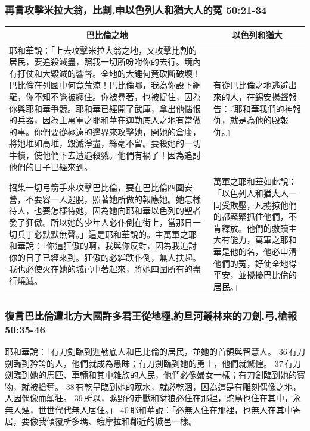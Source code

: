 \subsubsection{再言攻擊米拉大翁，比割,申以色列人和猶大人的冤 50:21-34}
\begin{table}[H]
\centering
\begin{tabular}{p{}|p{5.750cm}}\hline\hline
\multicolumn{1}{c|}{巴比倫之地}&\multicolumn{1}{c}{以色列和猶大}\\\hline
耶和華說：「上去攻擊米拉大翁之地，又攻擊比割的居民，要追殺滅盡，照我一切所吩咐你的去行。境內有打仗和大毀滅的響聲。全地的大錘何竟砍斷破壞！巴比倫在列國中何竟荒涼！巴比倫哪，我為你設下網羅，你不知不覺被纏住。你被尋著，也被捉住，因為你與耶和華爭競。耶和華已經開了武庫，拿出他惱恨的兵器，因為主萬軍之耶和華在迦勒底人之地有當做的事。你們要從極遠的邊界來攻擊她，開她的倉廩，將她堆如高堆，毀滅淨盡，絲毫不留。要殺她的一切牛犢，使他們下去遭遇殺戮。他們有禍了！因為追討他們的日子已經來到。 
&有從巴比倫之地逃避出來的人，在錫安揚聲報告：『耶和華我們的神報仇，就是為他的殿報仇。』\\\hline
招集一切弓箭手來攻擊巴比倫，要在巴比倫四圍安營，不要容一人逃脫，照著她所做的報應她。她怎樣待人，也要怎樣待她，因為她向耶和華以色列的聖者發了狂傲。所以她的少年人必仆倒在街上，當那日一切兵丁必默默無聲。」這是耶和華說的。主萬軍之耶和華說：「你這狂傲的啊，我與你反對，因為我追討你的日子已經來到。狂傲的必絆跌仆倒，無人扶起。我也必使火在她的城邑中著起來，將她四圍所有的盡行燒滅。
&萬軍之耶和華如此說：「以色列人和猶大人一同受欺壓，凡擄掠他們的都緊緊抓住他們，不肯釋放。他們的救贖主大有能力，萬軍之耶和華是他的名，他必申清他們的冤，好使全地得平安，並攪擾巴比倫的居民。」\\\hline
\end{tabular}
\end{table}



\subsubsection{復言巴比倫遭北方大國許多君王從地極,約旦河叢林來的刀劍,弓,槍報 50:35-46}
耶和華說：「有刀劍臨到迦勒底人和巴比倫的居民，並她的首領與智慧人。 36 有刀劍臨到矜誇的人，他們就成為愚昧；有刀劍臨到她的勇士，他們就驚惶。 37 有刀劍臨到她的馬匹、車輛和其中雜族的人民，他們必像婦女一樣；有刀劍臨到她的寶物，就被搶奪。 38 有乾旱臨到她的眾水，就必乾涸，因為這是有雕刻偶像之地，人因偶像而顛狂。 39 所以，曠野的走獸和豺狼必住在那裡，鴕鳥也住在其中，永無人煙，世世代代無人居住。」 40 耶和華說：「必無人住在那裡，也無人在其中寄居，要像我傾覆所多瑪、蛾摩拉和鄰近的城邑一樣。

